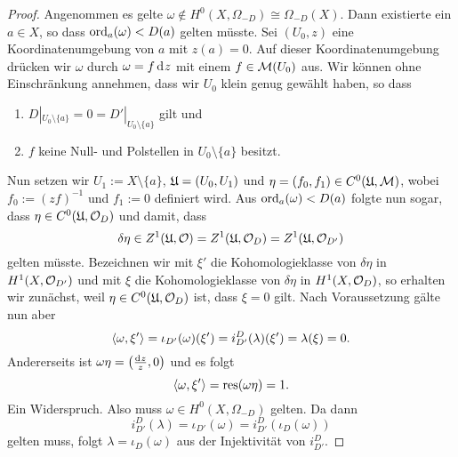 \begin{proof}
  Angenommen es gelte $\omega \notin H^0(X, \Omega_{-D}) \cong
  \Omega_{-D}(X)$. Dann existierte ein $a \in X$, so dass
  $\operatorname{ord}_a(\omega) < D(a)$ gelten müsste. Sei $(U_0, z)$ eine Koordinatenumgebung
  von $a$ mit $z(a) = 0$. Auf dieser Koordinatenumgebung drücken wir
  $\omega$ durch $\omega = f \d[z]$ mit einem $f \in \mathcal{M}(U_0)$
  aus. Wir können ohne Einschränkung annehmen, dass wir $U_0$ klein
  genug gewählt haben, so dass
  \begin{enumerate}
  \item $D|_{U_0 \setminus \{a\}} = 0 = D'|_{U_0 \setminus
      \{a\}}$ gilt und
  \item $f$ keine Null- und Polstellen in $U_0 \setminus \{a\}$ besitzt.
  \end{enumerate}
  Nun setzen wir $U_1 := X \setminus \{a\}$, $\mathfrak{U} = (U_0, U_1)$ und
  $\eta = (f_0, f_1) \in C^0(\mathfrak{U}, \mathcal{M})$, wobei $f_0 := (zf)^{-1}$ und
  $f_1 := 0$ definiert wird. Aus $\operatorname{ord}_a(\omega) < D(a)$ folgte nun
  sogar, dass $\eta \in C^0(\mathfrak{U}, \mathcal{O}_D)$ und damit, dass
  \[
  \delta \eta \in Z^1(\mathfrak{U}, \mathcal{O}) = Z^1(\mathfrak{U}, \mathcal{O}_D) = Z^1(\mathfrak{U},
  \mathcal{O}_{D'})
  \]
  gelten müsste. Bezeichnen wir mit $\xi'$ die
  Kohomologieklasse von $\delta \eta$ in $H^1(X, \mathcal{O}_{D'})$ und mit
  $\xi$ die Kohomologieklasse von $\delta \eta$ in $H^1(X, \mathcal{O}_D)$,
  so erhalten wir zunächst, weil \break$\eta \in C^0(\mathfrak{U}, \mathcal{O}_D)$ ist, dass
  $\xi = 0$ gilt. Nach Voraussetzung gälte nun aber
  \[
  \langle \omega, \xi' \rangle = \iota_{D'}(\omega)(\xi') =
  i_{D'}^D(\lambda)(\xi') = \lambda(\xi) = 0.
  \]
  Andererseits ist $\omega \eta = \left ( \frac{\d[z]}{z}, 0 \right )$
  und es folgt
  \[
  \langle \omega, \xi' \rangle = \operatorname{res}(\omega \eta) = 1.
  \]
  Ein Widerspruch. Also muss $\omega \in H^0(X, \Omega_{-D})$
  gelten. Da dann
  \[
  i_{D'}^D(\lambda) = \iota_{D'}(\omega) = i_{D'}^D(\iota_D(\omega))
  \]
  gelten muss, folgt $\lambda =
  \iota_D(\omega)$ aus der Injektivität von $i_{D'}^D$.
\end{proof}

